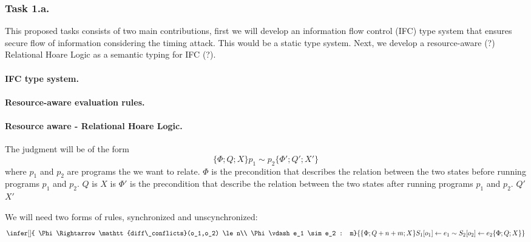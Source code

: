 \subsubsection{Task 1.a.} 
This proposed tasks consists of two main contributions, first we will develop an information flow control (IFC) type system that ensures secure flow of information considering the timing attack.
%
This would be a static type system.
%
Next, we develop a resource-aware (?) Relational Hoare Logic as a semantic typing for IFC (?). 
%

\paragraph{IFC type system.}

\paragraph{Resource-aware evaluation rules.}

\paragraph{Resource aware - Relational Hoare Logic.}
The judgment will be of the form 
%
\[\{\Phi; Q; X\} p_1 \sim p_2 \{\Phi'; Q'; X'\}\]
%
where $p_1$ and $p_2$ are programs the we want to relate.%
$\Phi$ is the precondition that describes the relation between the two states before running programs $p_1$ and $p_2$. 
%
$Q$ is
%
$X$ is
%
$\Phi'$ is the precondition that describe the relation between the two states after running programs $p_1$ and $p_2$.
%
$Q'$
%
$X'$

We will need two forms of rules, synchronized and unscynchronized:
\[
\infer[]{ \Phi \Rightarrow \mathtt{diff\_conflicts}(o_1,o_2) \le n\\  \Phi \vdash e_1 \sim e_2 : m}{\{\Phi; Q+n+m; X\} S_1[o_1] \leftarrow e_1 \sim S_2[o_2] \leftarrow e_2 \{\Phi; Q; X\}  }
\]

